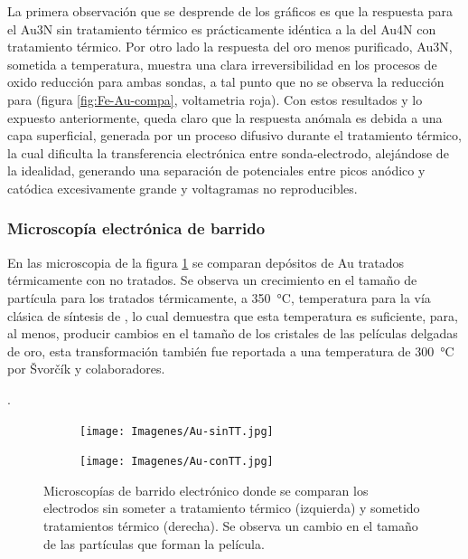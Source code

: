 {			La primera observación que se desprende de los gráficos es que la respuesta para el Au3N sin tratamiento térmico es prácticamente idéntica a la del Au4N con tratamiento térmico. Por otro lado la respuesta del oro menos purificado, Au3N, sometida a temperatura, muestra una clara irreversibilidad en los procesos de oxido reducción para ambas sondas, a tal punto que no se observa la reducción para \ferroferri\space (figura \ref{fig:Fe-Au-compa}, voltametria roja). Con estos resultados y lo expuesto anteriormente, queda claro que la respuesta anómala es debida a una capa superficial, generada por un proceso difusivo durante el tratamiento térmico, la cual dificulta la transferencia electrónica entre sonda-electrodo, alejándose de la idealidad, generando una separación de potenciales entre picos anódico y catódica excesivamente grande y voltagramas no reproducibles.
			
		\subsubsection{Microscopía electrónica de barrido}
			  		
			 En las microscopia de la figura \ref{fig:Au_compTT} se comparan depósitos de Au tratados térmicamente con no tratados. Se observa un crecimiento en el tamaño de partícula para los tratados térmicamente, a \SI{350}{\celsius}, temperatura para la vía clásica de síntesis de \pdm, lo cual demuestra que esta temperatura es suficiente, para, al menos, producir cambios en el tamaño de los cristales de las películas delgadas de oro, esta transformación también fue reportada a una temperatura de \SI{300}{\celsius} por \v{S}vor\v{c}\'ik y colaboradores.}\cite{Svorcik2010}.
			 		\begin{figure}[th]
		 	   	    \begin{subfigure}[t]{0.49\textwidth}
			       	\texttt{[image: Imagenes/Au-sinTT.jpg]}
			   		\end{subfigure}
			   		\begin{subfigure}[t]{0.49\textwidth}
			   	    \texttt{[image: Imagenes/Au-conTT.jpg]}
			   		\end{subfigure}
					 \caption[Microscopía comparativa electrodos Au]{Microscopías de barrido electrónico donde se comparan los electrodos sin someter a tratamiento térmico (izquierda) y sometido tratamientos térmico (derecha). Se observa un cambio en el tamaño de las partículas que forman la película.}
					 \label{fig:Au_compTT}	
				     \end{figure}
		 		 		

